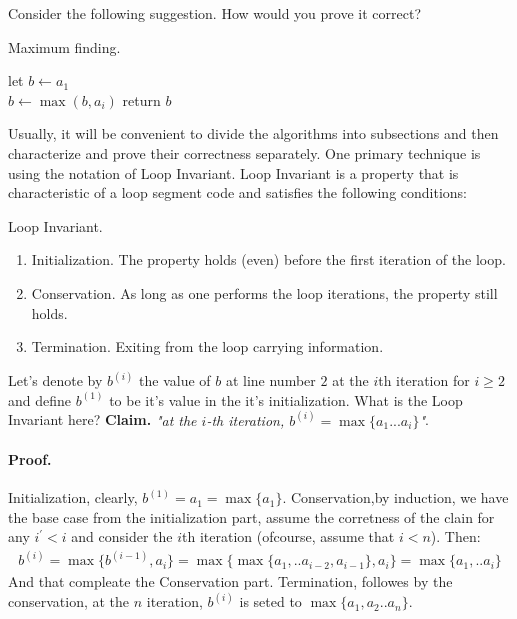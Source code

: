 Consider the following suggestion. How would you prove it correct?  
\begin{algbox}{Maximum finding.}
\begin{algorithm*}[H]
{}
 let \(b \leftarrow a_1 \) \\ 
  { 
        \(b \leftarrow \max \left(b, a_i \right) \)
    } 
 return \( b \) 
\end{algorithm*}
\end{algbox}
Usually, it will be convenient to divide the algorithms into subsections and then characterize and prove their correctness separately. One primary technique is using the notation of Loop Invariant. Loop Invariant is a property that is characteristic of a loop segment code  and satisfies the following conditions:
\begin{defbox}{Loop Invariant.} 
\begin{enumerate}
  \item Initialization. The property holds (even) before the first iteration of the loop.    
    \item Conservation. As long as one performs the loop iterations, the property still holds.
    \item Termination. Exiting from the loop carrying information.
\end{enumerate}
\end{defbox}

Let's denote by $b^{(i)}$ the value of $b$ at line number $2$ at the $i$th iteration for $i\ge2$ and define $b^{(1)}$ to be it's value in the it's initialization.  What is the Loop Invariant here? \textbf{Claim.} \textit{"at the \(i\)-th iteration, $b^{(i)} = \max{ \{ a_1 ... a_{i} \} } $"}. 
\paragraph{Proof.} Initialization, clearly, $ b^{(1)} = a_{1} = \max{ \{ a_1 \} } $. Conservation,by induction, we have the base case from the initialization part, assume the corretness of the clain for any $i^\prime < i$ and consider the $i$th iteration (ofcourse, assume that $i<n$). Then:  
\begin{equation*}
  \begin{split}
b^{(i)} = \max{ \{ b^{(i-1)}, a_{i} \} } = \max{ \{ \max{ \{ a_1, .. a_{i-2}, a_{i-1} \} }, a_{i} \} } = \max{ \{  a_{1}, .. a_{i} \} }
  \end{split}
\end{equation*} 
And that compleate the Conservation part. Termination, followes by the conservation, at the $n$ iteration, $b^{(i)}$ is seted to $\max{ \{ a_1 ,a_2 .. a_n  \}}$. 


